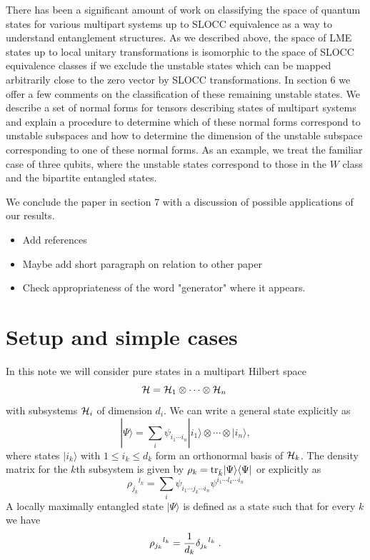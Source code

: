 \documentclass[12pt]{article}
\theoremstyle{definition}
\newcommand{\be}{\begin{equation}}
\newcommand{\ee}{\end{equation}}
\newcommand{\tr}{{\rm tr}}
\begin{document}
There has been a significant amount of work on classifying the space of quantum states for various multipart systems up to SLOCC equivalence as a way to understand entanglement structures. As we described above, the space of LME states up to local unitary transformations is isomorphic to the space of SLOCC equivalence classes if we exclude the unstable states which can be mapped arbitrarily close to the zero vector by SLOCC transformations. In section 6 we offer a few comments on the classification of these remaining unstable states. We describe a set of normal forms for tensors describing states of multipart systems and explain a procedure to determine which of these normal forms correspond to unstable subspaces and how to determine the dimension of the unstable subspace corresponding to one of these normal forms. As an example, we treat the familiar case of three qubits, where the unstable states correspond to those in the $W$ class and the bipartite entangled states.

We conclude the paper in section 7 with a discussion of possible applications of our results.

\begin{itemize}
\item
Add references
\item
Maybe add short paragraph on relation to other paper
\item
Check appropriateness of the word "generator" where it appears.
\end{itemize}

\section{Setup and simple cases}

In this note we will consider pure states in a multipart Hilbert space
\[
{\cal H} = {\cal H}_{1} \otimes \cdots \otimes {\cal H}_{n} \;
\]
with subsystems ${\cal H}_i$ of dimension $d_i$. We can write a general state explicitly as
\be
|\Psi \rangle = \sum_i \psi_{i_1 \cdots i_n} |i_1 \rangle \otimes \cdots \otimes |i_n \rangle,
\ee
where states $|i_k \rangle$ with $1 \le i_k \le d_k$ form an orthonormal basis of ${\cal H}_k$. The density matrix for the $k$th subsystem is given by $\rho_k = \tr_{\bar{k}} | \Psi \rangle \langle \Psi |$ or explicitly as
\be
\rho_{j_k} {}^{l_k} = \sum_{i}  \psi_{i_1 \cdots j_k \cdots i_n}\psi^{i_1 \cdots l_k \cdots i_n}
\ee
A locally maximally entangled state $|\Psi \rangle$ is defined as a state such that for every $k$ we have
\be
\rho_{j_k} {}^{l_k} = {1 \over d_k} \delta_{j_k} {}^{l_k} \; .
\ee
\end{document}
